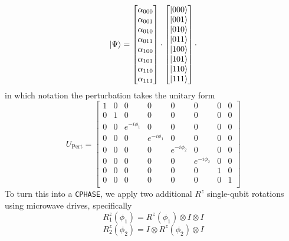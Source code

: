 \documentclass{report}
\begin{document}
\begin{appendices}
\begin{equation*}
\ket{\Psi} = 
    \begin{bmatrix}
    \alpha_{000} \\\alpha_{001} \\\alpha_{010} \\\alpha_{011} \\\alpha_{100} \\\alpha_{101} \\\alpha_{110} \\\alpha_{111} \\
    \end{bmatrix} \cdot
    \begin{bmatrix}
    \ket{000} \\\ket{001} \\\ket{010} \\\ket{011} \\\ket{100} \\\ket{101} \\\ket{110} \\\ket{111} \\
    \end{bmatrix} \cdot
\end{equation*}
in which notation the perturbation takes the unitary form
\begin{equation*}
    U_\mathrm{Pert} = 
    \begin{bmatrix}
        1 & 0 & 0 & 0 & 0 & 0 & 0 & 0\\
        0 & 1 & 0 & 0 & 0 & 0 & 0 & 0\\
        0 & 0 & e^{-i\phi_1} & 0 & 0 & 0 & 0 & 0\\
        0 & 0 & 0 & e^{-i\phi_1} & 0 & 0 & 0 & 0\\
        0 & 0 & 0 & 0 & e^{-i\phi_2} & 0 & 0 & 0\\
        0 & 0 & 0 & 0 & 0 & e^{-i\phi_2} & 0 & 0\\
        0 & 0 & 0 & 0 & 0 & 0 & 1 & 0\\
        0 & 0 & 0 & 0 & 0 & 0 & 0 & 1\\
    \end{bmatrix}
\end{equation*}
To turn this into a \texttt{CPHASE}, we apply two additional $R^z$ single-qubit rotations using microwave drives, specifically
\begin{equation*}
    R^z_1(\phi_1) = R^z(\phi_1) \otimes I \otimes I
\end{equation*}
\begin{equation*}
    R^z_2(\phi_2) = I \otimes R^z(\phi_2) \otimes I

\end{equation*}
\end{appendices}
\end{document}
